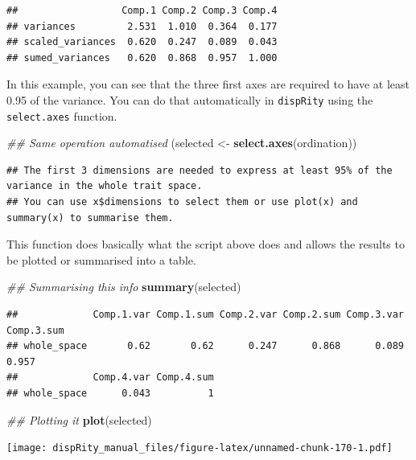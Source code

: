\documentclass[
]{book}
\newenvironment{Shaded}{\begin{snugshade}}{\end{snugshade}}
\newcommand{\CommentTok}[1]{\textcolor[rgb]{0.56,0.35,0.01}{\textit{#1}}}
\newcommand{\KeywordTok}[1]{\textcolor[rgb]{0.13,0.29,0.53}{\textbf{#1}}}
\newcommand{\NormalTok}[1]{#1}
\newcommand{\StringTok}[1]{\textcolor[rgb]{0.31,0.60,0.02}{#1}}
\begin{document}
\begin{verbatim}
##                  Comp.1 Comp.2 Comp.3 Comp.4
## variances         2.531  1.010  0.364  0.177
## scaled_variances  0.620  0.247  0.089  0.043
## sumed_variances   0.620  0.868  0.957  1.000
\end{verbatim}

In this example, you can see that the three first axes are required to have at least 0.95 of the variance.
You can do that automatically in \texttt{dispRity} using the \texttt{select.axes} function.

\begin{Shaded}
\begin{Highlighting}[]
\CommentTok{\#\# Same operation automatised}
\NormalTok{(selected \textless{}{-}}\StringTok{ }\KeywordTok{select.axes}\NormalTok{(ordination))}
\end{Highlighting}
\end{Shaded}

\begin{verbatim}
## The first 3 dimensions are needed to express at least 95% of the variance in the whole trait space.
## You can use x$dimensions to select them or use plot(x) and summary(x) to summarise them.
\end{verbatim}

This function does basically what the script above does and allows the results to be plotted or summarised into a table.

\begin{Shaded}
\begin{Highlighting}[]
\CommentTok{\#\# Summarising this info}
\KeywordTok{summary}\NormalTok{(selected)}
\end{Highlighting}
\end{Shaded}

\begin{verbatim}
##             Comp.1.var Comp.1.sum Comp.2.var Comp.2.sum Comp.3.var Comp.3.sum
## whole_space       0.62       0.62      0.247      0.868      0.089      0.957
##             Comp.4.var Comp.4.sum
## whole_space      0.043          1
\end{verbatim}

\begin{Shaded}
\begin{Highlighting}[]
\CommentTok{\#\# Plotting it}
\KeywordTok{plot}\NormalTok{(selected)}
\end{Highlighting}
\end{Shaded}

\texttt{[image: dispRity\_manual\_files/figure-latex/unnamed-chunk-170-1.pdf]}
\end{document}
